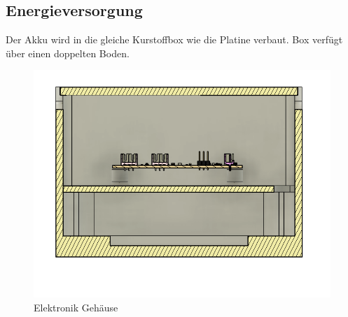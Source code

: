 \subsection{Energieversorgung}
Der Akku wird in die gleiche Kurstoffbox wie die Platine verbaut. Box verfügt über einen doppelten Boden.


\begin{figure}
    \centering
    \includegraphics[width=0.5\linewidth]{assets/electronics housing.png}
    \caption{Elektronik Gehäuse}
    \label{fig:enter-label}
\end{figure}